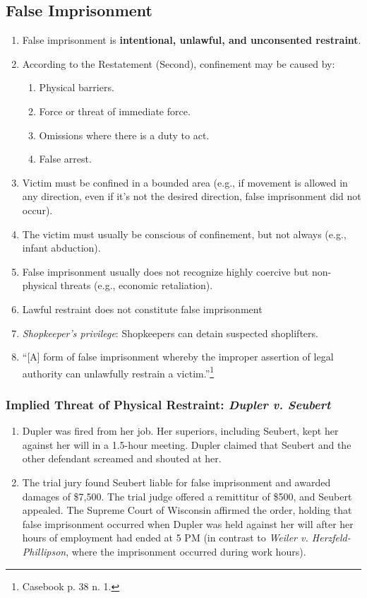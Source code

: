\subsection{False Imprisonment}

\begin{enumerate}
    \item False imprisonment is \textbf{intentional, unlawful, and unconsented 
    restraint}.
    \item According to the Restatement (Second), confinement may be caused by:
    \begin{enumerate}
        \item Physical barriers.
        \item Force or threat of immediate force.
        \item Omissions where there is a duty to act.
        \item False arrest.
    \end{enumerate}
    \item Victim must be confined in a bounded area (e.g., if movement is 
    allowed in any direction, even if it's not the desired direction, false 
    imprisonment did not occur).
    \item The victim must usually be conscious of confinement, but not always 
    (e.g., infant abduction).
    \item False imprisonment usually does not recognize highly coercive but 
    non-physical threats (e.g., economic retaliation).
    \item Lawful restraint does not constitute false imprisonment
    \item \emph{Shopkeeper's privilege}: Shopkeepers can detain suspected 
    shoplifters.
    \item ``[A] form of false imprisonment whereby the improper assertion of 
    legal authority can unlawfully restrain a victim.''\footnote{Casebook p. 
    38 n. 1.}
\end{enumerate}

\subsubsection{Implied Threat of Physical Restraint: \emph{Dupler v. Seubert}}

\begin{enumerate}
    \item Dupler was fired from her job. Her superiors, including Seubert, 
    kept her against her will in a 1.5-hour meeting. Dupler claimed that 
    Seubert and the other defendant screamed and shouted at her.
    \item The trial jury found Seubert liable for false imprisonment and 
    awarded damages of \$7,500. The trial judge offered a remittitur of \$500, 
    and Seubert appealed. The Supreme Court of Wisconsin affirmed the order, 
    holding that false imprisonment occurred when Dupler was held against her 
    will after her hours of employment had ended at 5 PM (in contrast to 
    \emph{Weiler v. Herzfeld-Phillipson}, where the imprisonment occurred 
    during work hours).
\end{enumerate}

